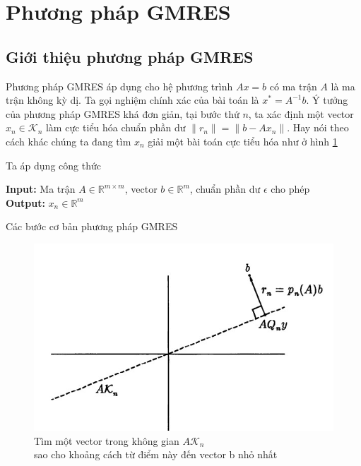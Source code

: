 \documentclass[14pt, a4paper]{article}
\numberwithin{equation}{section}
\numberwithin{algorithm}{section}
\numberwithin{figure}{section}
\numberwithin{dl}{section}
\numberwithin{md}{section}
\numberwithin{bd}{section}
\numberwithin{dn}{section}
\begin{document}
\section{Phương pháp GMRES}

\subsection{Giới thiệu phương pháp GMRES} \label{GMRES-Introduction}

Phương pháp GMRES áp dụng cho hệ phương trình $Ax=b$ có ma trận $A$ là ma trận không kỳ dị. Ta gọi nghiệm chính xác của bài toán là $x^* = A^{-1}b$. Ý tưởng của phương pháp GMRES khá đơn giản, tại bước thứ $n$, ta xác định một vector $x_n \in \mathcal{K}_n$ làm cực tiểu hóa chuẩn phần dư $\lVert r_n \rVert = \lVert b - A x_n \rVert$. Hay nói theo cách khác chúng ta đang tìm $x_n$ giải một bài toán cực tiểu hóa như ở hình \ref{fig:GMRES-LS}



Ta áp dụng công thức
\begin{algorithm}[h!]
    \hspace*{\algorithmicindent} \textbf{Input:} {Ma trận $A \in \mathbb{R}^{m \times m}$, vector $b \in \mathbb{R}^m$, chuẩn phần dư $\epsilon$ cho phép} \\
    \hspace*{\algorithmicindent} \textbf{Output:} {$x_n \in \mathbb{R}^m$}
    \caption{Các bước cơ bản phương pháp GMRES}\label{alg:GMRES}
    \begin{algorithmic}
        \EndFor
    \end{algorithmic}
\end{algorithm}

\begin{figure}[h!] \centering

    \includegraphics[scale=0.8]{GMRES-LS.jpg}
    \caption{Tìm một vector trong không gian $A \mathcal{K}_n$ \\ sao cho khoảng cách từ điểm này đến vector b nhỏ nhất}

    \label{fig:GMRES-LS}
\end{figure}
\end{document}
